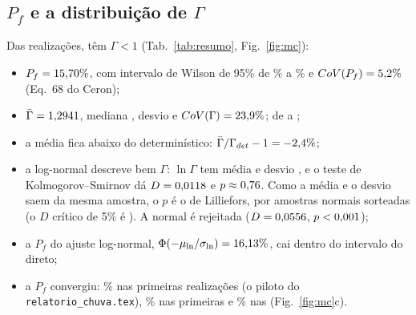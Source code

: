 \documentclass[11pt,a4paper]{article}
\begin{document}
\subsection{\texorpdfstring{$P_f$}{Pf} e a distribuição de \texorpdfstring{$\Gamma$}{Gamma}}
Das \NDireto{} realizações, \NfDireto{} têm $\Gamma < 1$ (Tab.~\ref{tab:resumo}, Fig.~\ref{fig:mc}):
\begin{itemize}
\item $P_f = 15{,}70\%$, com intervalo de Wilson de 95\% de \PfDiretoLo\% a \PfDiretoHi\% e
$CoV(P_f) = 5{,}2\%$ (Eq.~68 do Ceron);
\item $\bar\Gamma = 1{,}2941$, mediana \GammaMediana, desvio \GammaDP{} e $CoV(\Gamma) = 23{,}9\%$; de
\GammaMin{} a \GammaMax;
\item a média fica abaixo do determinístico: $\bar\Gamma/\Gamma_{det} - 1 = -2{,}4\%$;
\item a log-normal descreve bem $\Gamma$: $\ln\Gamma$ tem média \LnMu{} e desvio \LnSigma, e o teste de
Kolmogorov--Smirnov dá $D = 0{,}0118$ e $p \approx 0{,}76$. Como a média e o desvio saem da mesma amostra, o $p$ é o de
Lilliefors, por \LillieB{} amostras normais sorteadas (o $D$ crítico de 5\% é \KSCritico). A normal é rejeitada
($D = 0{,}0556$, $p < 0{,}001$);
\item a $P_f$ do ajuste log-normal, $\Phi(-\mu_{\ln}/\sigma_{\ln}) = 16{,}13\%$, cai dentro do intervalo do direto;
\item a $P_f$ convergiu: \PfPrimeirasQuatrocentas\% nas \NPrimeirasQuatrocentas{} primeiras realizações (o piloto do
\texttt{relatorio\_chuva.tex}), \PfPrimeirasMil\% nas \NPrimeirasMil{} primeiras e \PfDireto\% nas \NDireto{}
(Fig.~\ref{fig:mc}c).
\end{itemize}
\end{document}
